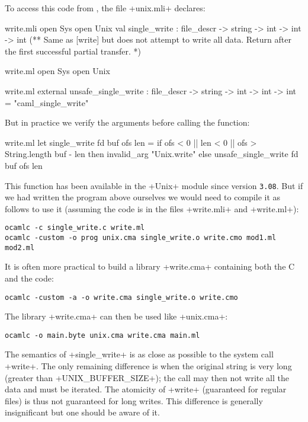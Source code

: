 To access this code from {\ocaml}, the file \ml+unix.mli+ declares:
%
\begin{codefile}{write.mli}
open Sys
open Unix
val single_write : file_descr -> string -> int -> int -> int 
(** Same as [write] but does not attempt to write all data. Return after
the first successful partial transfer. *)
\end{codefile}
%
\begin{codefile}{write.ml}
open Sys
open Unix
\end{codefile}
%
\begin{listingcodefile}{write.ml}
external unsafe_single_write :
  file_descr -> string -> int -> int -> int = "caml_single_write"
\end{listingcodefile}
%
But in practice we verify the arguments before calling the function: 
\begin{listingcodefile}{write.ml}
let single_write fd buf ofs len =
  if ofs < 0 || len < 0 || ofs > String.length buf - len
  then invalid_arg "Unix.write"
  else unsafe_single_write fd buf ofs len
\end{listingcodefile}
%
This function has been available in the \ml+Unix+ module since version
\texttt{3.08}. But if we had written the program above ourselves we would
need to compile it as follows to use it (assuming the {\ocaml} code is
in the files \ml+write.mli+ and \ml+write.ml+):
%
\begin{lstlisting}
ocamlc -c single_write.c write.ml
ocamlc -custom -o prog unix.cma single_write.o write.cmo mod1.ml mod2.ml
\end{lstlisting}
%
It is often more practical to build a library \ml+write.cma+ containing
both the C and the {\ocaml} code:
%
\begin{lstlisting}
ocamlc -custom -a -o write.cma single_write.o write.cmo
\end{lstlisting}
%
The library \ml+write.cma+ can then be used like \ml+unix.cma+:
%
\begin{lstlisting}
ocamlc -o main.byte unix.cma write.cma main.ml
\end{lstlisting}

The semantics of \ml+single_write+ is as close as possible to the
system call \ml+write+. The only remaining difference is when the
original string is very long (greater than \ml+UNIX_BUFFER_SIZE+); the
call may then not write all the data and must be iterated.  The
atomicity of \ml+write+ (guaranteed for regular files) is thus not
guaranteed for long writes. This difference is generally insignificant but one should
be aware of it.


